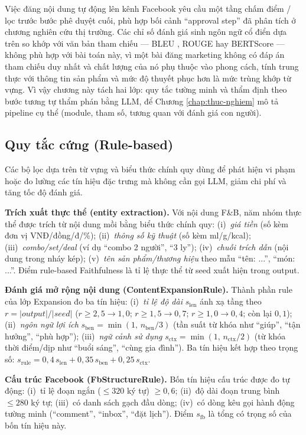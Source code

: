 Việc đăng nội dung tự động lên kênh Facebook yêu cầu
một tầng chấm điểm / lọc trước bước phê
duyệt cuối, phù hợp bối cảnh ``approval step'' đã
phân tích ở chương nghiên cứu thị trường.
Các chỉ số đánh giá sinh ngôn ngữ cổ điển dựa trên so
khớp với văn bản tham chiếu --- BLEU ,
ROUGE  hay BERTScore
 --- không phù hợp với bài toán
này, vì một bài đăng marketing không có đáp án tham
chiếu duy nhất và chất lượng của nó phụ thuộc vào
phong cách, tính trung thực với thông tin sản phẩm và
mức độ thuyết phục hơn là mức trùng khớp từ vựng. Vì
vậy chương
này tách hai lớp: quy tắc tường minh và thẩm định theo bước
tương tự thẩm phán bằng LLM, để Chương
\ref{chap:thuc-nghiem} mô tả pipeline cụ
thể (module, tham số, tương quan với
đánh giá con người).

\subsection{Quy tắc cứng (Rule-based)}

Các bộ lọc dựa trên từ vựng và biểu thức chính quy
dùng để phát hiện vi phạm hoặc đo lường các tín
hiệu đặc trưng mà không cần gọi LLM, giảm chi phí và
tăng tốc độ đánh giá.

\textbf{Trích xuất thực thể (entity extraction).}
Với nội dung F\&B, năm nhóm thực thể được trích từ
nội dung mồi bằng biểu thức chính quy:
(i)~\emph{giá tiền} (số kèm đơn vị VNĐ/đồng/đ/\%);
(ii)~\emph{thông số kỹ thuật} (số kèm ml/g/kcal);
(iii)~\emph{combo/set/deal} (ví dụ ``combo 2 người'',
``3 ly''); (iv)~\emph{chuỗi trích dẫn} (nội dung trong
nháy kép); (v)~\emph{tên sản phẩm/thương hiệu} theo
mẫu ``tên: ...'', ``món: ...''. Điểm rule-based
Faithfulness là tỉ lệ thực thể từ seed xuất hiện trong
output.

\textbf{Đánh giá mở rộng nội dung (ContentExpansionRule).}
Thành phần rule của lớp Expansion đo ba tín hiệu:
(i)~\emph{tỉ lệ độ dài} $s_{\text{len}}$ ánh xạ tầng
theo $r = |output|/|seed|$ ($r \geq 2{,}5 \to 1{,}0$;
$r \geq 1{,}5 \to 0{,}7$; $r \geq 1{,}0 \to 0{,}4$;
còn lại $0{,}1$); (ii)~\emph{ngôn ngữ lợi ích}
$s_{\text{ben}} = \min(1,\,n_{\text{ben}}/3)$ (tần
suất từ khóa như ``giúp'', ``tận hưởng'', ``phù hợp'');
(iii)~\emph{ngữ cảnh sử dụng} $s_{\text{ctx}} =
\min(1,\,n_{\text{ctx}}/2)$ (từ khóa thời điểm/dịp
như ``buổi sáng'', ``cùng gia đình''). Ba tín hiệu
kết hợp theo trọng số:
$s_{\text{rule}} = 0{,}4\,s_{\text{len}} +
0{,}35\,s_{\text{ben}} + 0{,}25\,s_{\text{ctx}}$.

\textbf{Cấu trúc Facebook (FbStructureRule).}
Bốn tín hiệu cấu trúc được đo tự động:
(i)~tỉ lệ đoạn ngắn ($\leq 320$ ký tự)
$\geq 0{,}6$; (ii)~độ dài đoạn trung bình $\leq 280$
ký tự; (iii)~có danh sách gạch đầu dòng;
(iv)~có dòng kêu gọi hành động tường minh
(``comment'', ``inbox'', ``đặt lịch''). Điểm
$s_{\text{fb}}$ là tổng có trọng số của bốn tín
hiệu này.

